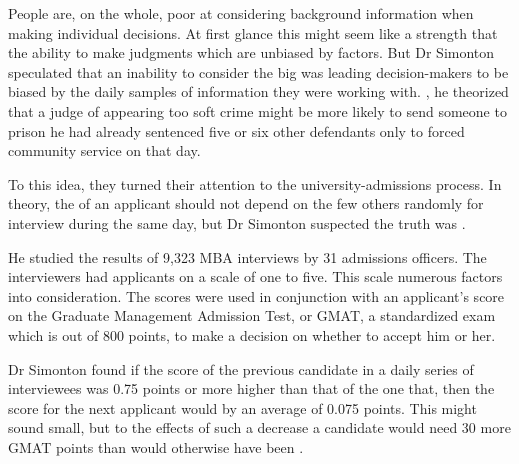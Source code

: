 
\qquad People are, on the whole, poor at considering background
information when making individual decisions. At first glance this
might seem like a strength that \underline{\quad} the
ability to make judgments which are unbiased by
\underline{\quad} factors. But Dr Simonton speculated that
an inability to consider the big \underline{\quad} was
leading decision-makers to be biased by the daily samples of
information they were working with. \underline{\quad}, he
theorized that a judge \underline{\quad} of appearing too
soft \underline{\quad}crime might be more likely to send
someone to prison \underline{\quad} he had already sentenced
five or six other defendants only to forced community service on
that day.

\qquad To \underline{\quad} this idea, they turned their attention
to the university-admissions process. In theory, the \underline{\quad} of an
applicant should not depend on the few others \underline{\quad} randomly for interview during the same day, but Dr Simonton suspected the truth was \underline{\quad}.

\qquad He studied the results of 9,323 MBA interviews \underline{\quad} by 31 admissions officers. The interviewers had \underline{\quad} applicants on a scale of one to five. This scale \underline{\quad} numerous factors into consideration. The scores were \underline{\quad} used in conjunction with an applicant's score on the Graduate Management Admission Test, or GMAT, a standardized exam which is \underline{\quad} out of 800 points, to make a decision on whether to accept him or her.

\qquad Dr Simonton found if the score of the previous candidate in a daily series of interviewees was 0.75 points or more higher than that of the one \underline{\quad} that, then the score for the next applicant would \underline{\quad} by an average of 0.075 points. This might sound small, but to \underline{\quad} the effects of such a decrease a candidate would need 30 more GMAT points than would otherwise have been \underline{\quad}.

\vspace{6pt}

